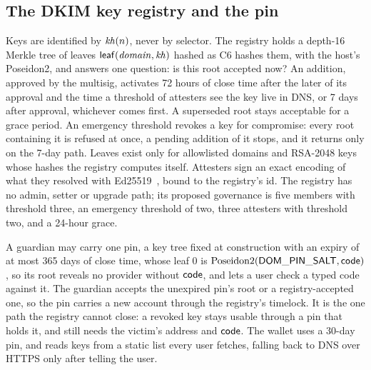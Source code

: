 \subsection{The DKIM key registry and the pin}\label{sec:design-registry}
Keys are identified by $\mathit{kh}(n)$, never by selector. The registry holds a
depth-16 Merkle tree of leaves $\mathsf{leaf}(\mathit{domain}, \mathit{kh})$ hashed as C6
hashes them, with the host's Poseidon2, and answers one question: is this
root accepted now? An addition, approved by the
multisig, activates 72 hours of close time after the later of its approval
and the time a threshold of attesters see the key live in DNS, or 7 days
after approval, whichever comes first. A
superseded root stays acceptable for a grace period. An emergency threshold
revokes a key for compromise: every root containing it is refused at once, a
pending addition of it stops, and it returns only on the 7-day
path. Leaves exist only for allowlisted domains
and RSA-2048 keys whose hashes the registry computes
itself. Attesters sign an exact encoding of what
they resolved with Ed25519~\cite{rfc8032}, bound to the registry's
id. The registry has no admin, setter or
upgrade path; its proposed governance is five members with threshold three,
an emergency threshold of two, three attesters with threshold two, and a
24-hour grace.

A guardian may carry one pin, a key tree fixed at construction with an expiry
of at most 365 days of close time, whose leaf 0 is
$\mathrm{Poseidon2}(\mathsf{DOM\_PIN\_SALT}, \mathsf{code})$, so its root reveals no provider
without $\mathsf{code}$, and lets a user check a typed code against it. The guardian
accepts the unexpired pin's root or a registry-accepted one, so the pin
carries a new account through the registry's timelock. It is
the one path the registry cannot close: a revoked key stays usable through a
pin that holds it, and still needs the victim's address and $\mathsf{code}$. The
wallet uses a 30-day pin, and reads keys from a static list every user
fetches, falling back to DNS over HTTPS only after telling the
user.

